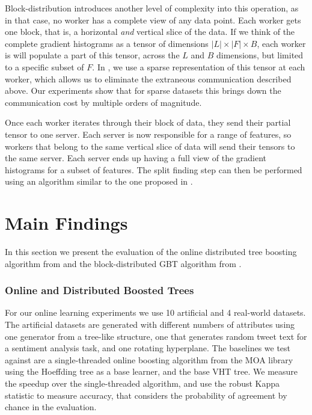 Block-distribution introduces another level of complexity into this operation, as
in that case, no worker has a complete view of any data point. Each worker gets one block,
that is, a horizontal \emph{and} vertical slice of the data. If we think of the complete
gradient histograms as a tensor of dimensions $|L| \times |F| \times B$, each worker is
will populate a part of this tensor, across the $L$ and $B$ dimensions, but limited to a specific
subset of $F$. In \blockgbt, we use a sparse representation of this tensor at each worker, which allows
us to eliminate the extraneous communication described above. Our experiments show
that for sparse datasets this brings down the communication cost by multiple orders
of magnitude.

Once each worker iterates
through their block of data, they send their partial tensor to one server. Each server
is now responsible for a range of features, so workers that belong to the same vertical
slice of data will send their tensors to the same server. Each server ends up having
a full view of the gradient histograms for a subset of features. The split finding step
can then be performed using an algorithm similar to the one proposed in \citet{dimboost}.

\section{Main Findings}

In this section we present the evaluation of the online distributed tree boosting
algorithm from \boostvht and the block-distributed GBT algorithm from \blockgbt.

\subsubsection*{Online and Distributed Boosted Trees}
\label{sec:boostvht-results}

For our online learning experiments we use 10 artificial and 4 real-world datasets. The artificial
datasets are generated with different numbers of attributes using one generator
from a tree-like structure, one that generates random tweet text for a sentiment
analysis task, and one rotating hyperplane. The baselines we test against are
a single-threaded online boosting algorithm from the MOA \cite{bifet2010moa}
library using the Hoeffding tree as a base learner, and the base VHT tree.
We measure the speedup over the single-threaded algorithm, and use the
robust Kappa\cite{bifet2015efficient} statistic to measure accuracy,
that considers the probability of agreement by chance in the evaluation.

